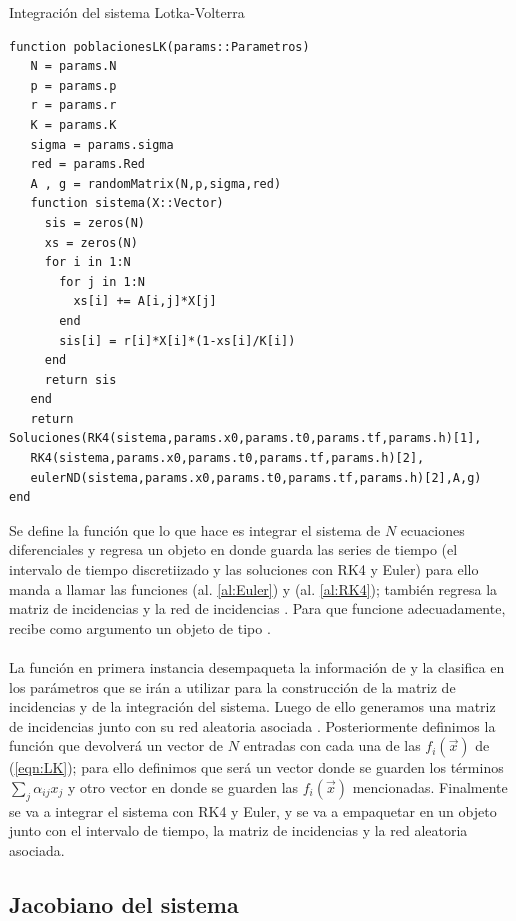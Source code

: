 \begin{algorithm}
	\label{al:poblacionesLK}
	\caption{Integración del sistema Lotka-Volterra}
	\begin{verbatim}
function poblacionesLK(params::Parametros)
   N = params.N
   p = params.p
   r = params.r
   K = params.K
   sigma = params.sigma
   red = params.Red
   A , g = randomMatrix(N,p,sigma,red)
   function sistema(X::Vector)
     sis = zeros(N)
     xs = zeros(N)
     for i in 1:N
       for j in 1:N
         xs[i] += A[i,j]*X[j]
       end
       sis[i] = r[i]*X[i]*(1-xs[i]/K[i])
     end
     return sis
   end
   return Soluciones(RK4(sistema,params.x0,params.t0,params.tf,params.h)[1],
   RK4(sistema,params.x0,params.t0,params.tf,params.h)[2],
   eulerND(sistema,params.x0,params.t0,params.tf,params.h)[2],A,g)
end
	\end{verbatim}
\end{algorithm}
\newpage
Se define la función  que lo que hace es integrar el sistema de $N$ ecuaciones diferenciales y regresa un objeto en donde guarda las series de tiempo (el intervalo de tiempo discretiizado y las soluciones con RK4 y Euler) para ello manda a llamar las funciones  (al. \ref{al:Euler}) y  (al. \ref{al:RK4}); también regresa la matriz de incidencias  y la red de incidencias . Para que funcione adecuadamente, recibe como argumento un objeto de tipo .\\
\\
La función en primera instancia desempaqueta la información de  y la clasifica en los parámetros que se irán a utilizar para la construcción de la matriz de incidencias y de la integración del sistema. Luego de ello generamos una matriz de incidencias  junto con su red aleatoria asociada . Posteriormente definimos la función  que devolverá un vector de $N$ entradas con cada una de las $f_i(\vec{x})$ de (\ref{eqn:LK}); para ello definimos  que será un vector donde se guarden los términos $\sum_{j}\alpha_{ij}x_j$ y  otro vector en donde se guarden las $f_i(\vec{x})$ mencionadas. Finalmente se va a integrar el sistema con RK4 y Euler, y se va a empaquetar en un objeto  junto con el intervalo de tiempo, la matriz de incidencias y la red aleatoria asociada.

\subsection{Jacobiano del sistema}\label{sec:Jacobiano}

